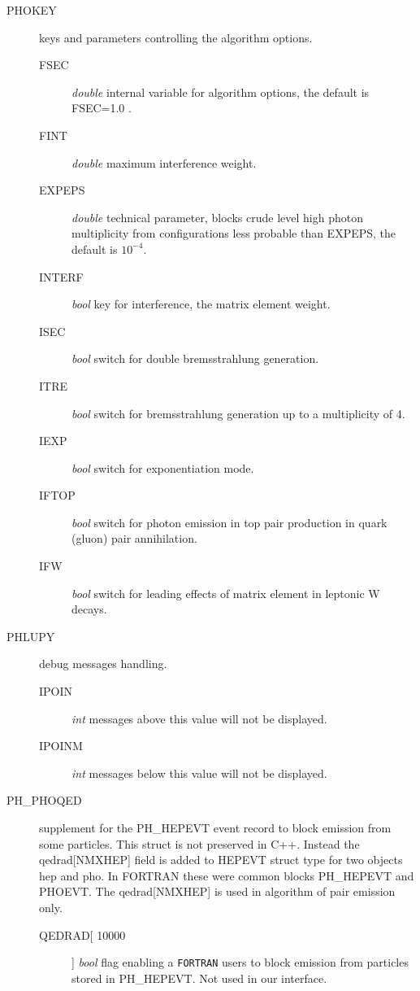 \documentclass[]{Photos_interface_design}
\begin{document}
\begin{description}
\item[PHOKEY] keys and parameters controlling the algorithm options.
    \begin{description}
	\item[FSEC]   \textit{double} internal variable for algorithm options, the default is FSEC=1.0\; .
	\item[FINT]   \textit{double} maximum interference weight.
	\item[EXPEPS] \textit{double} technical parameter, blocks crude level high photon multiplicity from configurations less probable than EXPEPS, the default is $10^{-4}$.
	\item[INTERF] \textit{bool} key for interference, the matrix element weight.
	\item[ISEC]   \textit{bool} switch for double bremsstrahlung generation.
	\item[ITRE]   \textit{bool} switch for bremsstrahlung generation up to a multiplicity of 4.
	\item[IEXP]   \textit{bool} switch for exponentiation mode.
	\item[IFTOP]  \textit{bool} switch for photon emission in top pair production in quark (gluon) pair annihilation.
	\item[IFW]    \textit{bool} switch for leading effects of matrix element in leptonic W decays.
    \end{description}
\end{description}

\begin{description}
\item[PHLUPY] debug messages handling.
    \begin{description}
    \item[IPOIN]  \textit{int} messages above this value will not be displayed.
	\item[IPOINM] \textit{int} messages below this value will not be displayed.
    \end{description}
\end{description}

\begin{description}
\item[PH\_PHOQED] supplement for the PH\_HEPEVT event record to block emission 
from some particles. This struct is not preserved in C++.
 Instead the qedrad[NMXHEP] field is added to HEPEVT struct type for two 
objects hep and pho. In FORTRAN these were common blocks PH\_HEPEVT and PHOEVT.
The qedrad[NMXHEP] is used in algorithm of pair emission only.
    \begin{description}
    \item[QEDRAD[ 10000]]  \textit{bool} flag enabling a {\tt FORTRAN} users
    to block emission from particles stored in PH\_HEPEVT. Not used in 
     our interface.
    \end{description}
\end{description}
\end{document}
